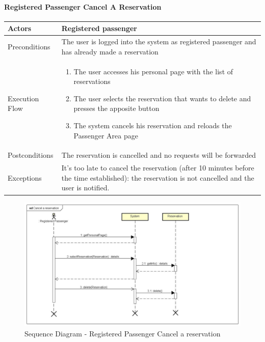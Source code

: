 \paragraph{Registered Passenger Cancel A Reservation}
\begin{center}
	\begin{tabular}{ | l | p{8cm} |}
		\hline Actors & Registered passenger
		\\ \hline
		Preconditions &
		The user is logged into the system as registered passenger and has already made
		a reservation
		\\ \hline
		Execution Flow &
		\begin{enumerate}
			\item The user accesses his personal page with the list of reservations
			\item The user selects the reservation that wants to delete and presses the apposite
			button
			\item The system cancels his reservation and reloads the Passenger Area page
		\end{enumerate}
		\\ \hline
		Postconditions & The reservation is cancelled and no requests will be forwarded
		\\ \hline
		Exceptions &
		It's too late to cancel the reservation (after 10 minutes before the time established):
		the reservation is not cancelled and the user is notified.
		\\ \hline
	\end{tabular}
\end{center}
\newpage
\begin{landscape}
\begin{figure}[!h]
	\begin{center}			
		\includegraphics[height=\textheight]{../SE2_SD/CancelAReservation}
		\caption{Sequence Diagram - Registered Passenger Cancel a reservation}	
	\end{center}
\end{figure}
\end{landscape}
\newpage
